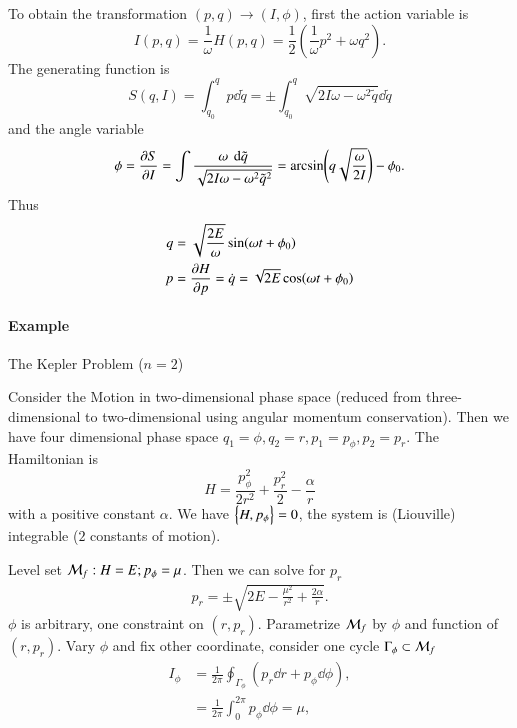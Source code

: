 To obtain the transformation $(p, q) \rightarrow (I, \phi)$, first the action variable is
\begin{equation*}
	I(p, q) = \frac{1}{\omega}H(p, q) = \frac{1}{2} \left( \frac{1}{\omega} p^2 + \omega q^2 \right) .
\end{equation*}
The generating function is
\begin{equation*}
	S(q, I ) = \int_{q_0}^{q} p \dd{\tilde{q}} = \pm \int_{q_0}^{q} \sqrt{2 I \omega - \omega^2 \tilde{q}} \dd{\tilde{q}}
\end{equation*}
and the angle variable
\begin{equation*}
	\phi = \pdv{S}{I} = \int \frac{\omega\ \dd{\tilde{q}}}{\sqrt{2I\omega - \omega^2 \tilde{q}^2}} = \arcsin(q \sqrt{\frac{\omega}{2I}}) - \phi_0.
\end{equation*}
Thus
\begin{align*}
	q &= \sqrt{\frac{2 E}{\omega}} \sin(\omega t + \phi_0) \\
	p &= \pdv{H}{p} = \dot{q} = \sqrt{2E} \cos(\omega t + \phi_0)
\end{align*}


\paragraph{Example} The Kepler Problem ($n=2$)

Consider the Motion in two-dimensional phase space (reduced from three-dimensional to two-dimensional using angular momentum conservation). Then we have four dimensional phase space $q_1 = \phi, q_2 = r, p_1 = p_\phi, p_2 = p_r$. The Hamiltonian is
\begin{equation*}
	H = \frac{p_\phi^2}{2r^2 } + \frac{p_r^2}{2} - \frac{\alpha}{r}
\end{equation*} 
with a positive constant $\alpha$. We have $\pb{H}{p_\phi} = 0$, the system is (Liouville) integrable ($2$ constants of motion). 

Level set $\mathcal{M}_f: H=E; p_\phi=\mu$. Then we can solve for $p_r$
\begin{align*}
	p_r = \pm \sqrt{2E - \frac{\mu^2}{r^2} + \frac{2\alpha}{r}}.
\end{align*}
$\phi$ is arbitrary, one constraint on $(r, p_r)$. Parametrize $\mathcal{M}_f$ by $\phi$ and function of $(r, p_r)$. Vary $\phi$ and fix other coordinate, consider one cycle $\Gamma_\phi \subset \mathcal{M}_f$
\begin{align*}
	I_\phi &= \frac{1}{2\pi} \oint_{\Gamma_\phi} \left( p_r \dd{r}+p_\phi \dd{\phi}  \right), \\
			 &= \frac{1}{2\pi} \int_0^{2\pi} p_\phi \dd{\phi} = \mu,
\end{align*}


